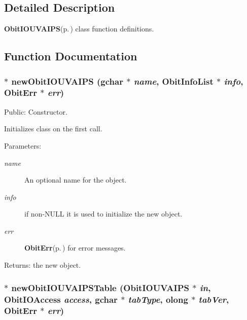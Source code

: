 \subsection{Detailed Description}
{\bf Obit\-IOUVAIPS}{\rm (p.\,\pageref{structObitIOUVAIPS})} class function definitions. 



\subsection{Function Documentation}
\subsubsection{$\ast$ new\-Obit\-IOUVAIPS (gchar $\ast$ {\em name}, {\bf Obit\-Info\-List} $\ast$ {\em info}, {\bf Obit\-Err} $\ast$ {\em err})}\label{ObitIOUVAIPS_8c_a10}


Public: Constructor. 

Initializes class on the first call. \begin{Desc}
\item[Parameters:]
\begin{description}
\item[{\em name}]An optional name for the object. \item[{\em info}]if non-NULL it is used to initialize the new object. \item[{\em err}]{\bf Obit\-Err}{\rm (p.\,\pageref{structObitErr})} for error messages. \end{description}
\end{Desc}
\begin{Desc}
\item[Returns:]the new object. \end{Desc}
\subsubsection{$\ast$ new\-Obit\-IOUVAIPSTable ({\bf Obit\-IOUVAIPS} $\ast$ {\em in}, Obit\-IOAccess {\em access}, gchar $\ast$ {\em tab\-Type}, {\bf olong} $\ast$ {\em tab\-Ver}, {\bf Obit\-Err} $\ast$ {\em err})}\label{ObitIOUVAIPS_8c_a30}


